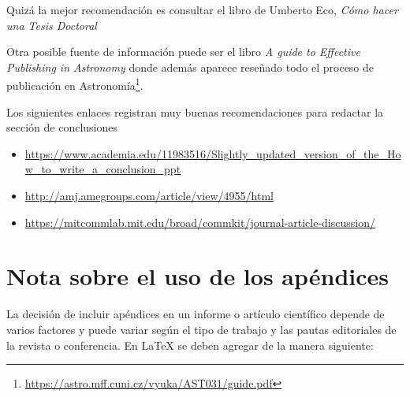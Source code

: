 \documentclass[spanish,notitlepage,letterpaper,11pt]{article} %
\begin{document}
Quizá la mejor recomendación es consultar el libro de Umberto Eco, {\it Cómo hacer una Tesis Doctoral} \cite{Eco1986} 

Otra posible fuente de información puede ser el libro \textit{A guide to Effective Publishing in Astronomy} \cite{BertoutBiemesderferHenri2012} donde además aparece reseñado todo el proceso de publicación en Astronomía\footnote{\url{https://astro.mff.cuni.cz/vyuka/AST031/guide.pdf}}.

Los siguientes enlaces registran muy buenas recomendaciones para redactar la sección de conclusiones 
\begin{itemize}
    \item \url{https://www.academia.edu/11983516/Slightly_updated_version_of_the_How_to_write_a_conclusion_ppt}
    \item \url{http://amj.amegroups.com/article/view/4955/html }
    \item \url{https://mitcommlab.mit.edu/broad/commkit/journal-article-discussion/ }
\end{itemize}


\section*{Nota sobre el uso de los apéndices}

La decisión de incluir apéndices en un informe o artículo científico depende de varios factores y puede variar según el tipo de trabajo y las pautas editoriales de la revista o conferencia. En \LaTeX{} se deben agregar de la manera siguiente:

\appendix
\end{document}
